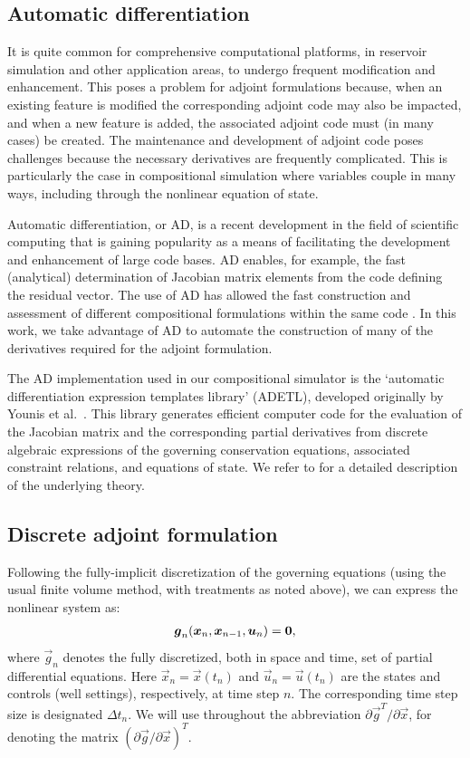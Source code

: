 \documentclass[twocolumn,numbook]{svjour3}          %
\def\u{{\vec u}}
\def\x{{\vec x}}
\def\p{{\vec{g}}}
\def\0{{\vec 0}}
\begin{document}
\subsection{Automatic differentiation} \label{sec:autodiff}


It is quite common for comprehensive computational platforms, in reservoir
simulation and other application areas, to undergo frequent modification and enhancement. This poses a problem for adjoint formulations
because, when an existing feature is modified the corresponding adjoint code may
also be impacted, and when a new feature is added, the associated adjoint code
must (in many cases) be created. The maintenance and development of adjoint code
poses challenges because the necessary derivatives are frequently complicated.
This is particularly the case in compositional simulation where variables couple
in many ways, including through the nonlinear equation of state.


Automatic differentiation, or AD, is a recent development in the field of
scientific computing that is gaining popularity as a means of facilitating the
development and enhancement of large code bases. AD enables, for example, the
fast (analytical) determination of Jacobian matrix elements from the code
defining the residual vector. The use of AD has allowed the fast construction
and assessment of different compositional formulations within the same code
\cite{Voskov_nonlinear:2009}. In this work, we take advantage of AD to automate
the construction of many of the derivatives required for the adjoint
formulation.


The AD implementation used in our compositional simulator is the `automatic
differentiation expression templates library' (ADETL), developed originally by
Younis et al.~\cite{Younis:2007}.  This library generates efficient computer
code for the evaluation of the Jacobian matrix and the corresponding partial
derivatives from discrete algebraic expressions of the governing conservation
equations, associated constraint relations, and equations of state. We refer to
\cite{Younis:2007} for a detailed description of the underlying theory.


\subsection{Discrete adjoint formulation} \label{section:discreteAdjoint}

Following the fully-implicit discretization of the governing equations (using the usual finite volume method, with treatments as noted above), we can express the nonlinear system as:
%
\begin{align}
\label{eq:DiscretizedEquations}
\p_n(\x_n, \x_{n-1}, \u_n) =  \0 \rm,
\end{align}
%
where $\p_n$ denotes the fully discretized, both in space and time,
set of partial differential equations. Here $\x_n = \x(t_n)$ and $\u_n =
\u(t_n)$ are the states and controls (well settings), respectively, at time step $n$. The corresponding time step size
is designated $\Delta t_n$. We will use throughout the abbreviation $\partial \p^T / \partial \x$, for denoting
the matrix $(\partial \p / \partial \x)^T$.
\end{document}
